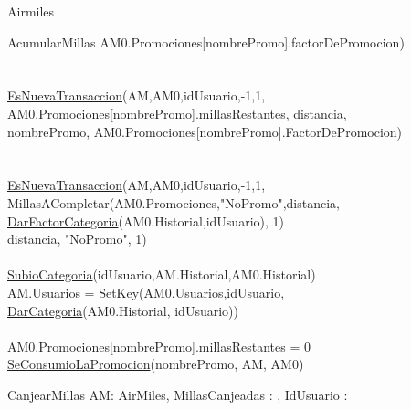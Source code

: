 \documentclass[11pt,a4paper]{article}
\newcommand{\Tipo}[1]{\mathsf{#1}}
\begin{document}
\begin{tad}{Airmiles}
\begin{proc}{AcumularMillas}
{			AM0.Promociones[nombrePromo].factorDePromocion) \implica
			\\
			\\
			\\
			\hyperref[sec:EsNuevaTransaccion]{EsNuevaTransaccion}(AM,AM0,idUsuario,-1,1,
			\\
			AM0.Promociones[nombrePromo].millasRestantes, distancia,
			\\ nombrePromo, AM0.Promociones[nombrePromo].FactorDePromocion) \yLuego
			\\
			\\
			\\
			\hyperref[sec:EsNuevaTransaccion]{EsNuevaTransaccion}(AM,AM0,idUsuario,-1,1,
			\\
			MillasACompletar(AM0.Promociones,"NoPromo",distancia,
			\\\hyperref[sec:DarFactorCategoria]{DarFactorCategoria}(AM0.Historial,idUsuario), 1)
			\\distancia, "NoPromo", 1) \yLuego
			\\
			\\
			\hyperref[sec:SubioCategoria]{SubioCategoria}(idUsuario,AM.Historial,AM0.Historial) \implicaLuego
			\\
			AM.Usuarios = SetKey(AM0.Usuarios,idUsuario,
			\\
			\hyperref[sec:DarCategoria]{DarCategoria}(AM0.Historial, idUsuario)) \land
			\\
			\\
			AM0.Promociones[nombrePromo].millasRestantes = 0 \implicaLuego
			\\
			\hyperref[sec:SeConsumioLaPromocion]{SeConsumioLaPromocion}(nombrePromo, AM, AM0)
		}
	\end{proc}

	\vspace{1cm}
	\hypertarget{sec:CanjearMillas}{}\label{sec:CanjearMillas}
	\begin{proc}{CanjearMillas}
		{\Inout AM: AirMiles, \In MillasCanjeadas : \Tipo{\R}, \In IdUsuario : \Tipo{\Z}}
		{}
	\end{proc}


\end{tad}
\end{document}
